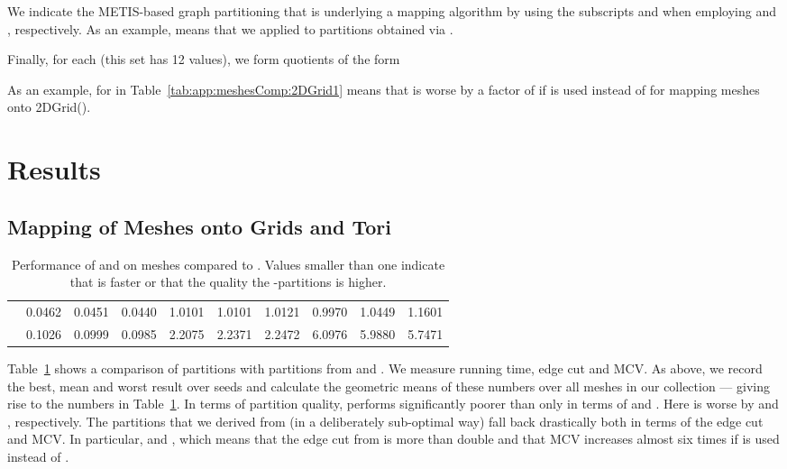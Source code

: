 \documentclass[pdftex]{llncs}
\newcommand{\metis}{\textsc{METIS}\xspace}
\begin{document}
We indicate the \metis-based graph partitioning that is underlying a
mapping algorithm by using the subscripts  and
 when employing  and ,
respectively. As an example,  means that we applied
 to partitions obtained via .

Finally, for each 
(this set has 12 values), we form quotients  of the form



As an example,  for 
in Table~\ref{tab:app:meshesComp:2DGrid1} means that 
is worse by a factor of  if  is used instead of
 for mapping meshes onto 2DGrid().

\section{Results}
\label{sec:results}
\subsection{Mapping of Meshes onto Grids and Tori}
\label{sub:exp-grids-tori-meshes}

\begin{table}[htb]
  \caption{Performance of  and  on meshes compared
    to . Values smaller than one indicate that
     is faster or that the quality the
    -partitions is higher.}
\begin{center}
\begin{tabular}{ l | c c c | c c c | c c c}
           &  &  &
     &  &  &
     &  &  &
     \\\hline \hline

     & 0.0462 & 0.0451 & 0.0440 & 1.0101 & 1.0101 & 1.0121 & 0.9970 & 1.0449 & 1.1601\\
     & 0.1026 & 0.0999 & 0.0985 & 2.2075 & 2.2371 & 2.2472 & 6.0976 & 5.9880 & 5.7471  
\end{tabular}
\end{center}
\label{tab:meansQuot}
\end{table}

Table~\ref{tab:meansQuot} shows a comparison of  partitions
with partitions from  and . We measure running
time, edge cut and MCV. As above, we record the best, mean and worst
result over  seeds and calculate the geometric means of these
numbers over all meshes in our collection --- giving rise to the
numbers  in
Table~\ref{tab:meansQuot}. In terms of partition quality, 
performs significantly poorer than  only in terms of
 and . Here  is worse by
 and , respectively.
The partitions that we derived from  (in a deliberately
sub-optimal way) fall back drastically both in terms of the edge cut
and MCV. In particular,  and
, which means that the edge cut from
 is more than double and that MCV increases almost six times
if  is used instead of .
\end{document}
